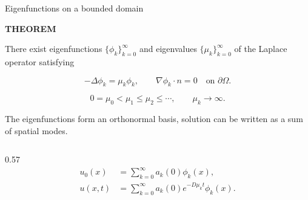 \begin{frame}{Eigenfunctions on a bounded domain}

  \vspace{-0.04cm}

  \begin{center}
    \begin{minipage}{0.91\textwidth}
      {\color{HydraGold}\bfseries\fontsize{7.2}{8.6}\selectfont
        THEOREM\par}

      \vspace{0.04cm}

      {\color{HydraWhite}\fontsize{8}{9.7}\selectfont
        There exist eigenfunctions $\{\phi_k\}_{k=0}^{\infty}$ and eigenvalues $\{\mu_k\}_{k=0}^{\infty}$ of the Laplace operator  satisfying
      \par}

      {\color{HydraWhite}\fontsize{10.2}{13}\selectfont
      \[
        -\Delta\phi_k=\mu_k\phi_k,
        \qquad
        \nabla\phi_k\cdot n=0
        \quad\text{on }\partial\Omega.
      \]
      }

      \vspace{-0.52cm}

      {\color{HydraWhite}\fontsize{9.8}{12.4}\selectfont
      \[
        0=\mu_0<\mu_1\leq\mu_2\leq\cdots,
        \qquad
        \boxed{\mu_k\longrightarrow\infty}.
      \]
      }

      \vspace{-0.10cm}

      {\color{HydraMuted}\fontsize{7.5}{9.1}\selectfont
        The eigenfunctions form an orthonormal basis, solution can be written as a sum of spatial modes.
      \par}
    \end{minipage}
  \end{center}

  \vspace{0.00cm}

  \begin{columns}[c,onlytextwidth]
    \begin{column}{0.57\textwidth}
      {\color{HydraWhite}\fontsize{9.4}{12.2}\selectfont
      \begin{align*}
        u_0(x)
        &=\sum_{k=0}^{\infty}a_k(0)\phi_k(x),
        \\[0.12cm]
        u(x,t)
        &=\sum_{k=0}^{\infty}
          a_k(0)e^{-D\mu_kt}\phi_k(x).
      \end{align*}
      }
    \end{column}


\end{columns}
\end{frame}
